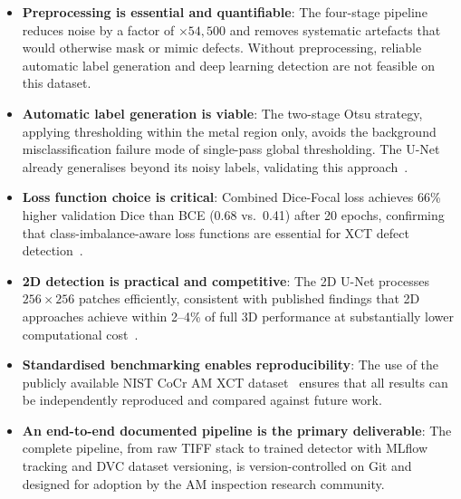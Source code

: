 \begin{itemize}
\item \textbf{Preprocessing is essential and quantifiable}: The four-stage pipeline reduces noise by
  a factor of $\times 54{,}500$ and removes systematic artefacts that would otherwise mask or mimic
  defects. Without preprocessing, reliable automatic label generation and deep learning detection are
  not feasible on this dataset.
\item \textbf{Automatic label generation is viable}: The two-stage Otsu strategy, applying
  thresholding within the metal region only, avoids the background misclassification failure mode of
  single-pass global thresholding. The U-Net already generalises beyond its noisy labels, validating
  this approach~\citep{Yosifov2020,Otsu1979}.
\item \textbf{Loss function choice is critical}: Combined Dice-Focal loss achieves 66\% higher
  validation Dice than BCE (0.68 vs.\ 0.41) after 20 epochs, confirming that class-imbalance-aware
  loss functions are essential for XCT defect detection~\citep{Sudre2017,Lin2017}.
\item \textbf{2D detection is practical and competitive}: The 2D U-Net processes $256\times256$
  patches efficiently, consistent with published findings that 2D approaches achieve within 2--4\% of
  full 3D performance at substantially lower computational cost~\citep{Wong2021}.
\item \textbf{Standardised benchmarking enables reproducibility}: The use of the publicly available
  NIST CoCr AM XCT dataset~\citep{NIST_CoCr} ensures that all results can be independently reproduced
  and compared against future work.
\item \textbf{An end-to-end documented pipeline is the primary deliverable}: The complete pipeline,
  from raw TIFF stack to trained detector with MLflow tracking and DVC dataset versioning, is
  version-controlled on Git and designed for adoption by the AM inspection research community.
\end{itemize}

